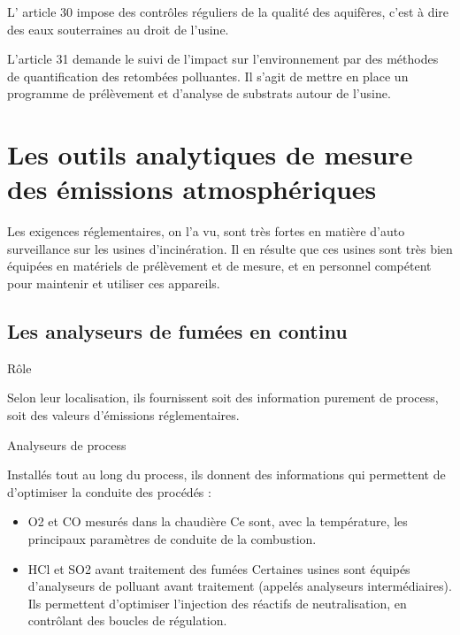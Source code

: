 L’ article 30 impose des contrôles réguliers de la qualité des aquifères, c’est à dire des eaux souterraines au droit de l’usine.
\vspace{0.3cm}

L’article 31 demande le suivi de l’impact sur l’environnement par des méthodes de quantification des retombées polluantes. Il s’agit de mettre en place un programme de prélèvement et d’analyse de substrats autour de l’usine.







\section{Les outils analytiques de mesure des émissions atmosphériques}

Les exigences réglementaires, on l’a vu, sont très fortes en matière d’auto surveillance sur les usines d’incinération.
Il en résulte que ces usines sont très bien équipées en matériels de prélèvement et de mesure, et en personnel compétent pour maintenir et utiliser ces appareils.

\subsection{Les analyseurs de fumées en continu}
\vspace{0.3cm}
Rôle
\vspace{0.3cm}

Selon leur localisation, ils fournissent soit des information purement de process, soit des valeurs d’émissions réglementaires.



\vspace{0.3cm}
Analyseurs de process
\vspace{0.3cm}

Installés tout au long du process, ils donnent des informations qui permettent de d’optimiser la conduite des procédés :

\begin{itemize}
\item 	O2 et CO mesurés dans la chaudière
Ce sont, avec la température, les principaux paramètres de conduite de la combustion.
\item	HCl et SO2 avant traitement des fumées
Certaines usines sont équipés d’analyseurs de polluant avant traitement (appelés analyseurs intermédiaires). Ils permettent d’optimiser l’injection des réactifs de neutralisation, en contrôlant des boucles de régulation.
\end{itemize}


